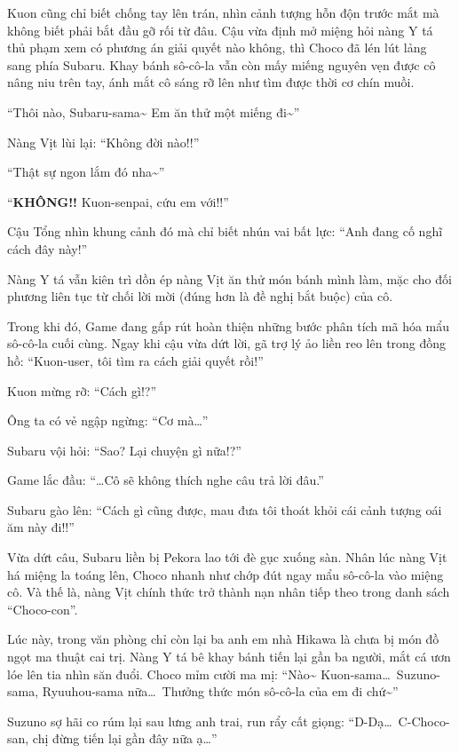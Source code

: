 \documentclass[../main.tex]{subfiles}
\begin{document}
Kuon cũng chỉ biết chống tay lên trán, nhìn cảnh tượng hỗn độn trước mắt mà không biết phải bắt đầu gỡ rối từ đâu. Cậu vừa định mở miệng hỏi nàng Y tá thủ phạm xem có phương án giải quyết nào không, thì Choco đã lén lút lảng sang phía Subaru. Khay bánh sô-cô-la vẫn còn mấy miếng nguyên vẹn được cô nâng niu trên tay, ánh mắt cô sáng rỡ lên như tìm được thời cơ chín muồi.


``Thôi nào, Subaru-sama\~{} Em ăn thử một miếng đi\~{}''

Nàng Vịt lùi lại: ``Không đời nào!!''

``Thật sự ngon lắm đó nha\~{}''

``\textbf{KHÔNG!!} Kuon-senpai, cứu em với!!''

Cậu Tổng nhìn khung cảnh đó mà chỉ biết nhún vai bất lực: ``Anh đang cố nghĩ cách đây này!''

Nàng Y tá vẫn kiên trì dồn ép nàng Vịt ăn thử món bánh mình làm, mặc cho đối phương liên tục từ chối lời mời (đúng hơn là đề nghị bắt buộc) của cô.

Trong khi đó, Game đang gấp rút hoàn thiện những bước phân tích mã hóa mẩu sô-cô-la cuối cùng. Ngay khi cậu vừa dứt lời, gã trợ lý ảo liền reo lên trong đồng hồ: ``Kuon-user, tôi tìm ra cách giải quyết rồi!''

Kuon mừng rỡ: ``Cách gì!?''

Ông ta có vẻ ngập ngừng: ``Cơ mà\dots''

Subaru vội hỏi: ``Sao? Lại chuyện gì nữa!?''

Game lắc đầu: ``\dots Cô sẽ không thích nghe câu trả lời đâu.''

Subaru gào lên: ``Cách gì cũng được, mau đưa tôi thoát khỏi cái cảnh tượng oái ăm này đi!!''

Vừa dứt câu, Subaru liền bị Pekora lao tới đè gục xuống sàn. Nhân lúc nàng Vịt há miệng la toáng lên, Choco nhanh như chớp đút ngay mẩu sô-cô-la vào miệng cô. Và thế là, nàng Vịt chính thức trở thành nạn nhân tiếp theo trong danh sách ``Choco-con''.

Lúc này, trong văn phòng chỉ còn lại ba anh em nhà Hikawa là chưa bị món đồ ngọt ma thuật cai trị. Nàng Y tá bê khay bánh tiến lại gần ba người, mắt cá ươn lóe lên tia nhìn săn đuổi. Choco mỉm cười ma mị: ``Nào\~{} Kuon-sama\dots\ Suzuno-sama, Ryuuhou-sama nữa\dots\ Thưởng thức món sô-cô-la của em đi chứ\~{}''

Suzuno sợ hãi co rúm lại sau lưng anh trai, run rẩy cất giọng: ``D-Dạ\dots\ C-Choco-san, chị đừng tiến lại gần đây nữa ạ\dots''
\end{document}
